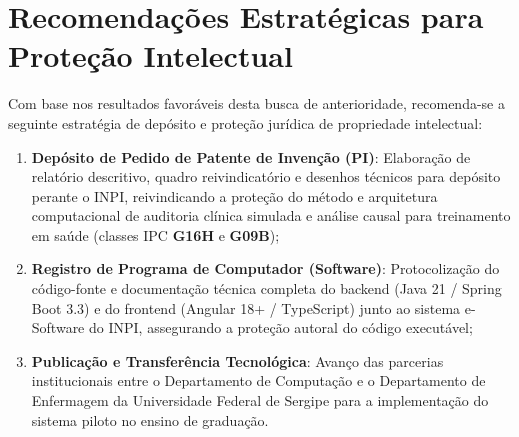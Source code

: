 \section{Recomendações Estratégicas para Proteção Intelectual}
\label{sec_recomendacoes_estrategicas}

Com base nos resultados favoráveis desta busca de anterioridade, recomenda-se a seguinte estratégia de depósito e proteção jurídica de propriedade intelectual:
\begin{enumerate}
    \item \textbf{Depósito de Pedido de Patente de Invenção (PI)}: Elaboração de relatório descritivo, quadro reivindicatório e desenhos técnicos para depósito perante o INPI, reivindicando a proteção do método e arquitetura computacional de auditoria clínica simulada e análise causal para treinamento em saúde (classes IPC \textbf{G16H} e \textbf{G09B});
    \item \textbf{Registro de Programa de Computador (Software)}: Protocolização do código-fonte e documentação técnica completa do backend (Java 21 / Spring Boot 3.3) e do frontend (Angular 18+ / TypeScript) junto ao sistema e-Software do INPI, assegurando a proteção autoral do código executável;
    \item \textbf{Publicação e Transferência Tecnológica}: Avanço das parcerias institucionais entre o Departamento de Computação e o Departamento de Enfermagem da Universidade Federal de Sergipe para a implementação do sistema piloto no ensino de graduação.
\end{enumerate}
